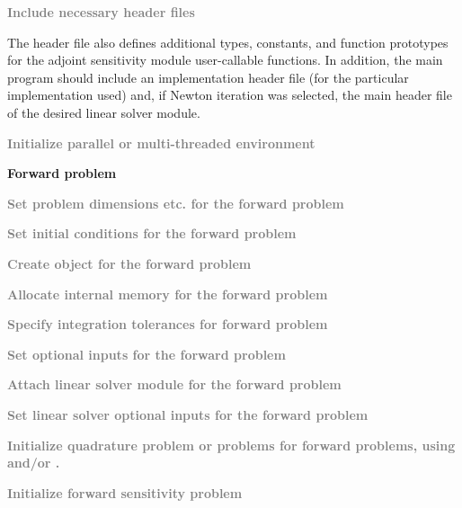 \begin{Steps}

\item
  \textcolor{gray}{\bf Include necessary header files}
  
  The  header file also defines additional types, constants, and
  function prototypes for the adjoint sensitivity module user-callable functions.
  In addition, the main program should include an {\nvector} implementation
  header file (for the particular implementation used) and, if Newton iteration 
  was selected, the main header file of the desired linear solver module.

\item
  \textcolor{gray}{\bf Initialize parallel or multi-threaded environment}

  \vspace{0.2in}\centerline{\bf Forward problem}

\item
  \textcolor{gray}{\bf Set problem dimensions etc. for the forward problem}

\item
  \textcolor{gray}{\bf Set initial conditions for the forward problem}

\item
  \textcolor{gray}{\bf Create {\idas} object for the forward problem}

\item
  \textcolor{gray}{\bf Allocate internal memory for the forward problem}

\item
  \textcolor{gray}{\bf Specify integration tolerances for forward problem}

\item
  \textcolor{gray}{\bf Set optional inputs for the forward problem}

\item
  \textcolor{gray}{\bf Attach linear solver module for the forward problem}

\item
  \textcolor{gray}{\bf Set linear solver optional inputs for the forward problem}

\item
  \textcolor{gray}{\bf Initialize quadrature problem or problems for forward
   problems, using  and/or .}

\item
  \textcolor{gray}{\bf Initialize forward sensitivity problem}


\end{Steps}
